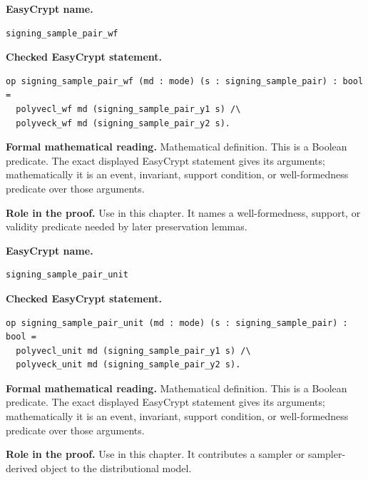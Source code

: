 \begin{formaldefinition}
\noindent\textbf{EasyCrypt name.}
\begin{lstlisting}[language=EasyCrypt,basicstyle=\ttfamily\scriptsize]
signing_sample_pair_wf
\end{lstlisting}
\noindent\textbf{Checked EasyCrypt statement.}
\begin{lstlisting}[language=EasyCrypt,basicstyle=\ttfamily\scriptsize]
op signing_sample_pair_wf (md : mode) (s : signing_sample_pair) : bool =
  polyvecl_wf md (signing_sample_pair_y1 s) /\
  polyveck_wf md (signing_sample_pair_y2 s).
\end{lstlisting}
\noindent\textbf{Formal mathematical reading.}
Mathematical definition. This is a Boolean predicate.  The exact displayed EasyCrypt statement gives its arguments; mathematically it is an event, invariant, support condition, or well-formedness predicate over those arguments.

\noindent\textbf{Role in the proof.}
Use in this chapter. It names a well-formedness, support, or validity predicate needed by later preservation lemmas.

\end{formaldefinition}

\begin{formaldefinition}
\noindent\textbf{EasyCrypt name.}
\begin{lstlisting}[language=EasyCrypt,basicstyle=\ttfamily\scriptsize]
signing_sample_pair_unit
\end{lstlisting}
\noindent\textbf{Checked EasyCrypt statement.}
\begin{lstlisting}[language=EasyCrypt,basicstyle=\ttfamily\scriptsize]
op signing_sample_pair_unit (md : mode) (s : signing_sample_pair) : bool =
  polyvecl_unit md (signing_sample_pair_y1 s) /\
  polyveck_unit md (signing_sample_pair_y2 s).
\end{lstlisting}
\noindent\textbf{Formal mathematical reading.}
Mathematical definition. This is a Boolean predicate.  The exact displayed EasyCrypt statement gives its arguments; mathematically it is an event, invariant, support condition, or well-formedness predicate over those arguments.

\noindent\textbf{Role in the proof.}
Use in this chapter. It contributes a sampler or sampler-derived object to the distributional model.

\end{formaldefinition}


